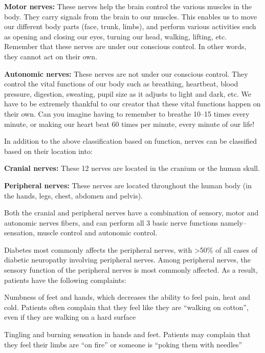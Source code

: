 { \item \textbf{Motor nerves:} These nerves help the brain control the various muscles in the body. They carry signals from the brain to our muscles. This enables us to move our different body parts (face, trunk, limbs), and perform various activities such as opening and closing our eyes, turning our head, walking, lifting, etc. Remember that these nerves are under our conscious control. In other words, they cannot act on their own.

 \item \textbf{Autonomic nerves:} These nerves are not under our conscious control. They control the vital functions of our body such as breathing, heartbeat, blood pressure, digestion, sweating, pupil size as it adjusts to light and dark, etc. We have to be extremely thankful to our creator that these vital functions happen on their own. Can you imagine having to remember to breathe 10–15 times every minute, or making our heart beat 60 times per minute, every minute of our life!

In addition to the above classification based on function, nerves can be classified based on their location into:

\item \textbf{Cranial nerves:} These 12 nerves are located in the cranium or the human skull.

 \item \textbf{Peripheral nerves:} These nerves are located throughout the human body (in the hands, legs, chest, abdomen and pelvis).

Both the cranial and peripheral nerves have a combination of sensory, motor and autonomic nerves fibers, and can perform all 3 basic nerve functions namely– sensation, muscle control and autonomic control.

Diabetes most commonly affects the peripheral nerves, with \textgreater  50\% of all cases of diabetic neuropathy involving peripheral nerves. Among peripheral nerves, the sensory function of the peripheral nerves is most commonly affected. As a result, patients have the following complaints:

\item Numbness of feet and hands, which decreases the ability to feel pain, heat and cold. Patients often complain that they feel like they are “walking on cotton”, even if they are walking on a hard surface

 \item Tingling and burning sensation in hands and feet. Patients may complain that they feel their limbs are “on fire” or someone is “poking them with needles”

}
